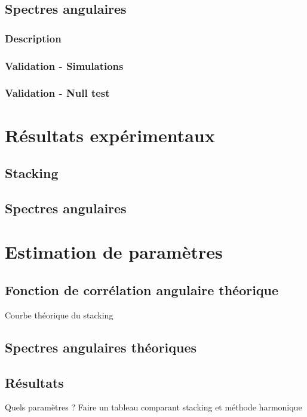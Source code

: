 \subsection{Spectres angulaires}
\subsubsection{Description}
\subsubsection{Validation - Simulations}
\subsubsection{Validation - Null test}


\section{Résultats expérimentaux}
\subsection{Stacking}
\subsection{Spectres angulaires}

\section{Estimation de paramètres}
\subsection{Fonction de corrélation angulaire théorique}
Courbe théorique du stacking
\subsection{Spectres angulaires théoriques}
\subsection{Résultats}
Quels paramètres ?
Faire un tableau comparant stacking et méthode harmonique

